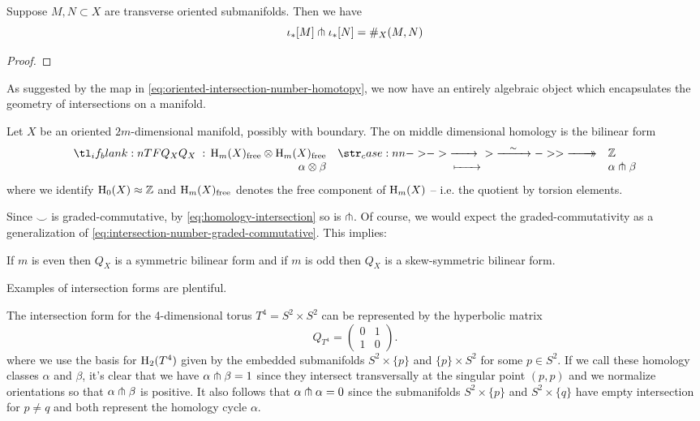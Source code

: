 \begin{theorem}
	Suppose $M,N\subset X$ are transverse oriented submanifolds. Then we have
	\[\iota_*[M]\pitchfork \iota_*[N] = \#_X(M,N)\]
\end{theorem}
\begin{proof}
\end{proof}

As suggested by the map in \cref{eq:oriented-intersection-number-homotopy}, we now have an entirely algebraic object which encapsulates the geometry of intersections on a manifold. 

\begin{definition}
	Let $X$ be an oriented $2m$-dimensional manifold, possibly with boundary. The  on middle dimensional homology is the bilinear form
	\[
		\lkxfunc{Q_X}{\H_m(X)_{\mathrm{free}}\otimes \H_m(X)_{\mathrm{free}}}{\Z}{\alpha\otimes \beta}{\alpha\tnsv \beta}
	\]
	where we identify $\operatorname{H}_0(X)\approx \mathbb{Z}$ and $\operatorname{H}_m(X)_{\mathrm{free}}$ denotes the free component of $\operatorname{H}_m(X)$ -- i.e. the quotient by torsion elements.
\end{definition}

Since $\smile$ is graded-commutative, by \cref{eq:homology-intersection} so is $\pitchfork$. Of course, we would expect the graded-commutativity as a generalization of \cref{eq:intersection-number-graded-commutative}. This implies:
\begin{proposition}
	If $m$ is even then $Q_X$ is a symmetric bilinear form and if $m$ is odd then $Q_X$ is a skew-symmetric bilinear form.
\end{proposition}

Examples of intersection forms are plentiful.
\begin{example}
	The intersection form for the 4-dimensional torus $T^4=S^2\times S^2$ can be represented by the hyperbolic matrix
	\[
		Q_{T^4} = \begin{pmatrix}0 & 1 \\ 1 & 0\end{pmatrix}.
	\]
	where we use the basis for $\operatorname{H}_2(T^4)$ given by the embedded submanifolds $S^2\times \{p\}$ and $\{p\}\times S^2$ for some $p\in S^2$. If we call these homology classes $\alpha$ and $\beta$, it's clear that we have $\alpha \pitchfork \beta = 1$ since they intersect transversally at the singular point $(p,p)$ and we normalize orientations so that $\alpha\pitchfork \beta$ is positive. It also follows that $\alpha\pitchfork \alpha = 0$ since the submanifolds $S^2\times \{p\}$ and $S^2\times \{q\}$ have empty intersection for $p\neq q$ and both represent the homology cycle $\alpha$.
\end{example}

